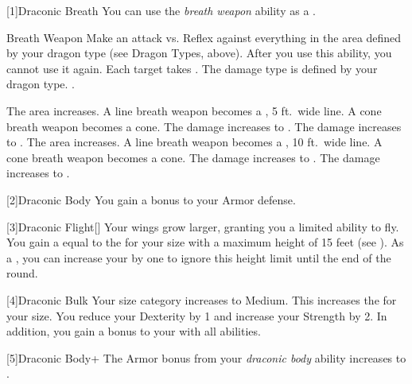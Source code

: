             [1]{Draconic Breath} You can use the \textit{breath weapon} ability as a .
            \begin{activeability}{Breath Weapon}
                \rankline
                Make an attack vs. Reflex against everything in the area defined by your dragon type (see Dragon Types, above).
                After you use this ability, you  cannot use it again.
                \hit Each target takes \damageranktwo{}.
                The damage type is defined by your dragon type.
                \miss {}.

                \rankline
                 The area increases.
                    A line breath weapon becomes a \arealarge, 5 ft.\ wide line.
                    A cone breath weapon becomes a \areamed cone.
                 The damage increases to \damagerankthree{}.
                 The damage increases to \damagerankfour{}.
                 The area increases.
                    A line breath weapon becomes a \areahuge, 10 ft.\ wide line.
                    A cone breath weapon becomes a \arealarge cone.
                 The damage increases to \damageranksix{}.
                 The damage increases to \damagerankseven{}.
            \end{activeability}

            [2]{Draconic Body} You gain a  bonus to your Armor defense.

            [3]{Draconic Flight}[\sparkle] Your wings grow larger, granting you a limited ability to fly.
            You gain a  equal to the  for your size with a maximum height of 15 feet (see ).
            As a , you can increase your  by one to ignore this height limit until the end of the round.

            [4]{Draconic Bulk} Your size category increases to Medium.
            This increases the  for your size.
            You reduce your Dexterity by 1 and increase your Strength by 2.
            In addition, you gain a  bonus to your  with all abilities.

            [5]{Draconic Body+} The Armor bonus from your \textit{draconic body} ability increases to .

